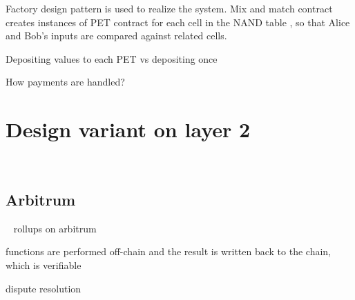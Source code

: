 Factory design pattern is used to realize the system. Mix and match contract creates instances of PET contract for each cell in the NAND table , so that Alice and Bob's inputs are compared against related cells.

Depositing values to each PET vs depositing once

How payments are handled? 


\section{Design variant on layer 2 }
\label{sec:arb}

~\subsection{Arbitrum}
~\cite{kalodner2018arbitrum}
rollups on arbitrum

functions are performed off-chain and the result is written back to the chain, which is verifiable

dispute resolution

